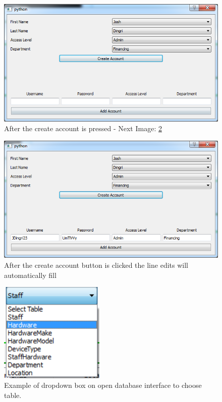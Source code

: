 \begin{figure}[H]
    \includegraphics[width=\textwidth]{./Testing/Images/AddAccountsButton.png}
    \caption{After the create account is pressed - Next Image: \ref{fig:AddAccountDetails}} \label{fig:AddAccountsButton}
\end{figure}

\begin{figure}[H]
    \includegraphics[width=\textwidth]{./Testing/Images/AddAccountDetails.png}
    \caption{After the create account button is clicked the line edits will automatically fill} \label{fig:AddAccountDetails}
\end{figure}

\begin{figure}[H]
    \includegraphics[width=50mm,scale=0.5]{./Testing/Images/ComboBoxHardware.png}
    \caption{Example of dropdown box on open database interface to choose table.} \label{fig:ComboBoxHardware}
\end{figure}

